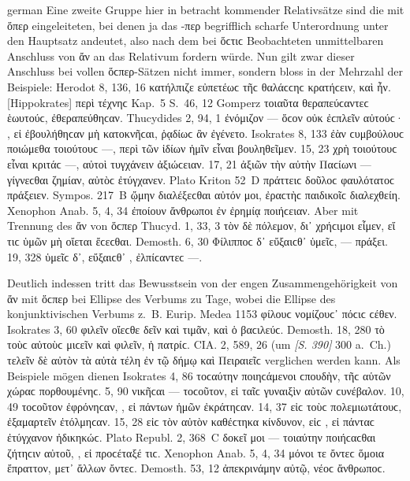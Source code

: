 \begin{otherlanguage*}{german}
Eine zweite Gruppe hier in betracht kommender Relativsätze sind die mit ὅπερ eingeleiteten, bei denen ja das -περ begrifflich scharfe Unterordnung unter den Hauptsatz andeutet, also nach dem bei ὅϲτιϲ Beobachteten unmittelbaren Anschluss von ἄν an das Relativum fordern würde. Nun gilt zwar dieser Anschluss bei vollen ὅϲπερ-Sätzen nicht immer, sondern bloss in der Mehrzahl der Beispiele: Herodot 8, 136, 16 κατήλπιζε εὐπετέωϲ τῆϲ θαλάϲϲηϲ κρατήϲειν,  καὶ ἦν. [Hippokrates] περὶ τέχνηϲ Kap.~5 S.~46, 12 Gomperz τοιαῦτα θεραπεύϲαντεϲ ἑωυτούϲ,  ἐθεραπεύθηϲαν. Thucydides 2, 94, 1 ἐνόμιζον — ὅϲον οὐκ ἐϲπλεῖν αὐτούϲ· , εἰ ἐβουλήθηϲαν μὴ κατοκνῆϲαι, ῥᾳδίωϲ ἂν ἐγένετο. Isokrates 8, 133 ἐὰν ϲυμβούλουϲ ποιώμεθα τοιούτουϲ —,  περὶ τῶν ἰδίων ἡμῖν εἶναι βουληθεῖμεν. 15, 23 χρὴ τοιούτουϲ εἶναι κριτάϲ —,  αὐτοὶ τυγχάνειν ἀξιώϲειαν. 17, 21 ἀξιῶν τὴν αὐτὴν Παϲίωνι — γίγνεϲθαι ζημίαν,  αὐτὸϲ ἐτύγχανεν. Plato Kriton 52~D πράττειϲ  δοῦλοϲ φαυλότατοϲ πράξειεν. Sympos. 217~Β ᾤμην διαλέξεϲθαι αὐτόν μοι,  ἐραϲτὴϲ παιδικοῖϲ διαλεχθείη. Xenophon Anab. 5, 4, 34 ἐποίουν  ἄνθρωποι ἐν ἐρημίᾳ ποιήϲειαν. Aber mit Trennung des ἄν von ὅϲπερ Thucyd. 1, 33, 3 τὸν δὲ πόλεμον, δι᾽  χρήϲιμοι  εἶμεν, εἴ τιϲ ὑμῶν μὴ οἴεται ἔϲεϲθαι. Demosth. 6, 30 Φίλιπποϲ δ᾽  εὔξαιϲθ᾽  ὑμεῖϲ, — πράξει. 19, 328 ὑμεῖϲ δ᾽,  εὔξαιϲθ᾽ , ἐλπίϲαντεϲ —.

Deutlich indessen tritt das Bewusstsein von der engen Zusammengehörigkeit von ἄν mit ὅϲπερ bei Ellipse des Verbums zu Tage, wobei die Ellipse des konjunktivischen Verbums z.~B. Eurip. Medea 1153 φίλουϲ νομίζουϲ᾽  πόϲιϲ ϲέθεν. Isokrates 3, 60 φιλεῖν οἴεϲθε δεῖν καὶ τιμᾶν,  καὶ ὁ βαϲιλεύϲ. Demosth. 18, 280 τὸ τοὺϲ αὐτοὺϲ μιϲεῖν καὶ φιλεῖν,  ἡ πατρίϲ. CIA. 2, 589, 26 (um \hypertarget{p390}{\emph{[S. 390]}}\label{p390} 300 a.~Ch.) τελεῖν δὲ αὐτὸν τὰ αὐτὰ τέλη ἐν τῷ δήμῳ  καὶ Πειραιεῖϲ verglichen werden kann. Als Beispiele mögen dienen Isokrates 4, 86 τοϲαύτην ποιηϲάμενοι ϲπουδὴν,  τῆϲ αὑτῶν χώραϲ πορθουμένηϲ. 5, 90 νικῆϲαι — τοϲοῦτον,  εἰ ταῖϲ γυναιξὶν αὐτῶν ϲυνέβαλον. 10, 49 τοϲοῦτον ἐφρόνηϲαν, , εἰ πάντων ἡμῶν ἐκράτηϲαν. 14, 37  εἰϲ τοὺϲ πολεμιωτάτουϲ, ἐξαμαρτεῖν ἐτόλμηϲαν. 15, 28 εἰϲ τὸν αὐτὸν καθέϲτηκα κίνδυνον, εἰϲ , εἰ πάνταϲ ἐτύγχανον ἠδικηκώϲ. Plato Republ. 2, 368~C δοκεῖ μοι — τοιαύτην ποιήϲαϲθαι ζήτηϲιν αὐτοῦ, , εἰ προϲέταξέ τιϲ. Xenophon Anab. 5, 4, 34 μόνοι τε ὄντεϲ ὅμοια ἔπραττον,  μετ᾽ ἄλλων ὄντεϲ. Demosth. 53, 12 ἀπεκρινάμην αὐτῷ,  νέοϲ ἄνθρωποϲ.


\end{otherlanguage*}
